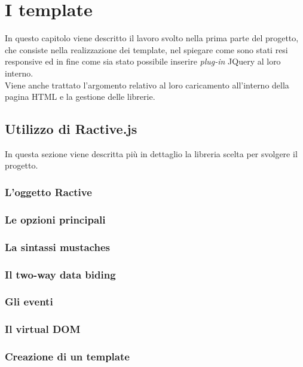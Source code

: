 
\chapter{I template}\label{cap:template}
In questo capitolo viene descritto il lavoro svolto nella prima parte del progetto, che consiste nella realizzazione dei template, nel spiegare come sono stati resi responsive ed in fine come sia stato possibile inserire \textit{plug-in} JQuery al loro interno.\\
Viene anche trattato l'argomento relativo al loro caricamento all'interno della pagina HTML e la gestione delle librerie.
\section{Utilizzo di Ractive.js}
In questa sezione viene descritta più in dettaglio la libreria scelta per svolgere il progetto.
\subsection{L'oggetto Ractive}

\subsection{Le opzioni principali}

\subsection{La sintassi mustaches}

\subsection{Il two-way data biding}

\subsection{Gli eventi}

\subsection{Il virtual DOM}

\subsection{Creazione di un template}


